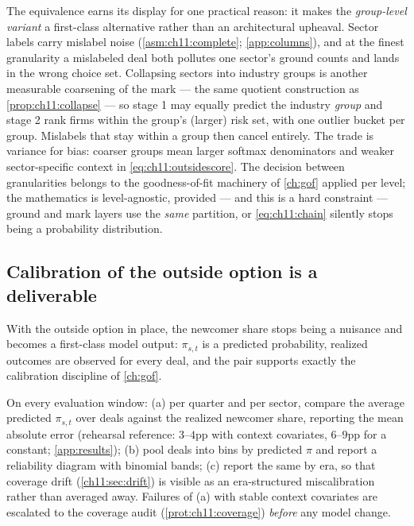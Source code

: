 The equivalence earns its display for one practical reason: it makes the
\emph{group-level variant} a first-class alternative rather than an
architectural upheaval. Sector labels carry mislabel noise
(\cref{asm:ch11:complete}; \cref{app:columns}), and at the finest
granularity a mislabeled deal both pollutes one sector's ground counts
and lands in the wrong choice set. Collapsing sectors into industry
groups is another measurable coarsening of the mark --- the same quotient
construction as \cref{prop:ch11:collapse} --- so stage 1 may equally
predict the industry \emph{group} and stage 2 rank firms within the
group's (larger) risk set, with one outlier bucket per group. Mislabels
that stay within a group then cancel entirely. The trade is variance for
bias: coarser groups mean larger softmax denominators and weaker
sector-specific context in \cref{eq:ch11:outsidescore}. The decision
between granularities belongs to the goodness-of-fit machinery of
\cref{ch:gof} applied per level; the mathematics is level-agnostic,
provided --- and this is a hard constraint --- ground and mark layers use
the \emph{same} partition, or \cref{eq:ch11:chain} silently stops being
a probability distribution.

\subsection{Calibration of the outside option is a deliverable}\label{ch11:sec:calibration}

With the outside option in place, the newcomer share stops being a
nuisance and becomes a first-class model output: $\pi_{s,t}$ is a
predicted probability, realized outcomes are observed for every deal, and
the pair supports exactly the calibration discipline of \cref{ch:gof}.

\begin{protocol}\label{prot:ch11:reliability}
On every evaluation window: (a) per quarter and per sector, compare the
average predicted $\pi_{s,t}$ over deals against the realized newcomer
share, reporting the mean absolute error (rehearsal reference: $3$--$4$pp
with context covariates, $6$--$9$pp for a constant;
\cref{app:results}); (b) pool deals into bins by predicted $\pi$ and
report a reliability diagram with binomial bands; (c) report the same by
era, so that coverage drift (\cref{ch11:sec:drift}) is visible as an
era-structured miscalibration rather than averaged away. Failures of (a)
with stable context covariates are escalated to the coverage audit
(\cref{prot:ch11:coverage}) \emph{before} any model change.
\end{protocol}

